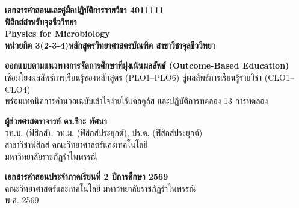 \begin{titlepage}
\thispagestyle{empty}
\begin{center}
    \vspace*{1.0cm}
    {\Large\bfseries\color{physCyan} เอกสารคำสอนและคู่มือปฏิบัติการรายวิชา 4011111}\\[0.5cm]
    {\Huge\bfseries\color{physRoyalBlue} ฟิสิกส์สำหรับจุลชีววิทยา}\\[0.4cm]
    {\LARGE\bfseries\color{physAmber} Physics for Microbiology}\\[0.4cm]
    {\large\bfseries\color{bioEmerald} หน่วยกิต 3(2-3-4)\quad หลักสูตรวิทยาศาสตรบัณฑิต สาขาวิชาจุลชีววิทยา}\\[1.6cm]

    \begin{tcolorbox}[
        enhanced,
        colback=boxBlueBg,
        colframe=physRoyalBlue,
        width=14.2cm,
        arc=2.5mm,
        boxrule=1.0pt,
        halign=center
    ]
        {\normalsize\bfseries ออกแบบตามแนวทางการจัดการศึกษาที่มุ่งเน้นผลลัพธ์ (Outcome-Based Education)}\\[4pt]
        {\small เชื่อมโยงผลลัพธ์การเรียนรู้ของหลักสูตร (PLO1--PLO6) สู่ผลลัพธ์การเรียนรู้รายวิชา (CLO1--CLO4)}\\[2pt]
        {\small พร้อมเทคนิคการคำนวณฉบับเข้าใจง่ายไร้แคลคูลัส และปฏิบัติการทดลอง 13 การทดลอง}
    \end{tcolorbox}

    \vspace{1.6cm}
    {\Large\bfseries ผู้ช่วยศาสตราจารย์ ดร.ชีวะ ทัศนา}\\[0.3cm]
    {\normalsize วท.บ. (ฟิสิกส์), วท.ม. (ฟิสิกส์ประยุกต์), ปร.ด. (ฟิสิกส์ประยุกต์)}\\[0.2cm]
    {\normalsize สาขาวิชาฟิสิกส์ คณะวิทยาศาสตร์และเทคโนโลยี}\\[0.2cm]
    {\normalsize มหาวิทยาลัยราชภัฏรำไพพรรณี}\\[1.8cm]

    \begin{tcolorbox}[
        enhanced,
        colback=softSmoke,
        colframe=bioEmerald,
        width=14.2cm,
        arc=2mm,
        halign=center
    ]
        {\small\bfseries เอกสารคำสอนประจำภาคเรียนที่ 2 ปีการศึกษา 2569}\\[2pt]
        {\footnotesize คณะวิทยาศาสตร์และเทคโนโลยี มหาวิทยาลัยราชภัฏรำไพพรรณี}\\[2pt]
        {\footnotesize พ.ศ. 2569}
    \end{tcolorbox}
\end{center}
\end{titlepage}
